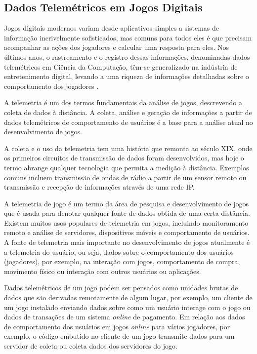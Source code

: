 \subsection{Dados Telemétricos em Jogos Digitais}
Jogos digitais modernos variam desde aplicativos simples a sistemas de informação incrivelmente sofisticados, mas comuns para todos eles é que precisam acompanhar as ações dos jogadores e calcular uma resposta para eles. Nos últimos anos, o rastreamento e o registro dessas informações, denominadas dados telemétricos em Ciência da Computação, têm-se generalizado na indústria de entretenimento digital, levando a uma riqueza de informações detalhadas sobre o comportamento dos jogadores \cite{el2016game}.

A telemetria é um dos termos fundamentais da análise de jogos, descrevendo a coleta de dados à distância. A coleta, análise e geração de informações a partir de dados telemétricos de comportamento de usuários é a base para a análise atual no desenvolvimento de jogos.

A coleta e o uso da telemetria tem uma história que remonta ao século XIX, onde os primeiros circuitos de transmissão de dados foram desenvolvidos, mas hoje o termo abrange qualquer tecnologia que permita a medição à distância. Exemplos comuns incluem transmissão de ondas de rádio a partir de um sensor remoto ou transmissão e recepção de informações através de uma rede IP.

A telemetria de jogo é um termo da área de pesquisa e desenvolvimento de jogos que é usada para denotar qualquer fonte de dados obtida de uma certa distância. Existem muitos usos populares de telemetria em jogos, incluindo monitoramento remoto e análise de servidores, dispositivos móveis e comportamento de usuários. A fonte de telemetria mais importante no desenvolvimento de jogos atualmente é a telemetria do usuário, ou seja, dados sobre o comportamento dos usuários (jogadores), por exemplo, na interação com jogos, comportamento de compra, movimento físico ou interação com outros usuários ou aplicações.

Dados telemétricos de um jogo podem ser pensados como unidades brutas de dados que são derivadas remotamente de algum lugar, por exemplo, um cliente de um jogo instalado enviando dados sobre como um usuário interage com o jogo ou dados de transações de um sistema \textit{online} de pagamento. Em relação aos dados de comportamento dos usuários em jogos \textit{online} para vários jogadores, por exemplo, o código embutido no cliente de um jogo transmite dados para um servidor de coleta ou coleta dados dos servidores do jogo.

